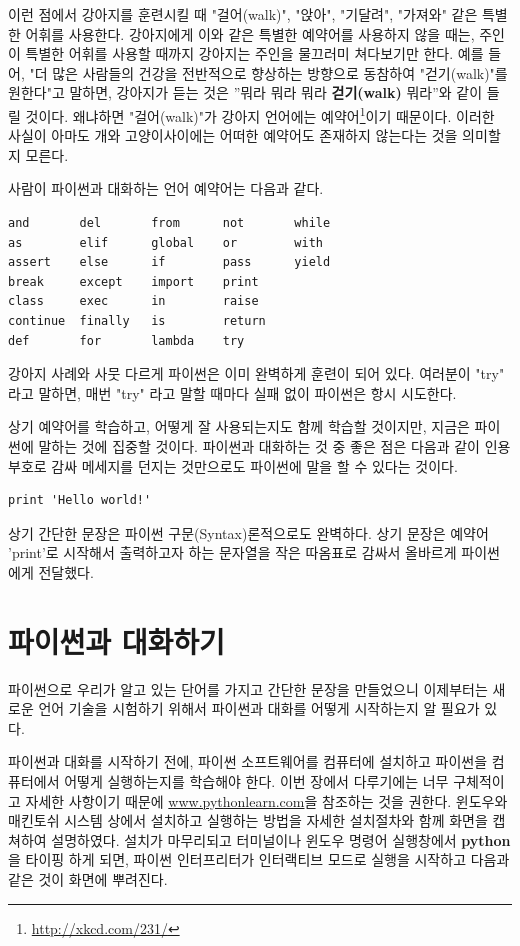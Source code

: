 이런 점에서 강아지를 훈련시킬 때 "걸어(walk)", "앉아", "기달려", "가져와" 같은 특별한 어휘를 사용한다. 
강아지에게 이와 같은 특별한 예약어를 사용하지 않을 때는, 주인이 특별한 어휘를 사용할 때까지 강아지는 주인을 물끄러미 쳐다보기만 한다. 
예를 들어, "더 많은 사람들의 건강을 전반적으로 향상하는 방향으로 동참하여 "걷기(walk)"를 원한다"고 말하면, 
강아지가 듣는 것은 ''뭐라 뭐라 뭐라 {\bf 걷기(walk)} 뭐라''와 같이 들릴 것이다. 
왜냐하면 "걸어(walk)"가 강아지 언어에는 예약어\footnote{\url{http://xkcd.com/231/}}이기 때문이다. 
이러한 사실이 아마도 개와 고양이사이에는 어떠한 예약어도 존재하지 않는다는 것을 의미할지 모른다.

사람이 파이썬과 대화하는 언어 예약어는 다음과 같다.

\beforeverb
\begin{verbatim}
and       del       from      not       while    
as        elif      global    or        with     
assert    else      if        pass      yield    
break     except    import    print              
class     exec      in        raise              
continue  finally   is        return             
def       for       lambda    try
\end{verbatim}
\afterverb
%

강아지 사례와 사뭇 다르게 파이썬은 이미 완벽하게 훈련이 되어 있다. 
여러분이 "try" 라고 말하면, 매번 "try" 라고 말할 때마다 실패 없이 파이썬은 항시 시도한다.

상기 예약어를 학습하고, 어떻게 잘 사용되는지도 함께 학습할 것이지만, 
지금은 파이썬에 말하는 것에 집중할 것이다. 
파이썬과 대화하는 것 중 좋은 점은 다음과 같이 인용부호로 감싸 메세지를 던지는 것만으로도 파이썬에 말을 할 수 있다는 것이다.

\beforeverb
\begin{verbatim}
print 'Hello world!'
\end{verbatim}
\afterverb

상기 간단한 문장은 파이썬 구문(Syntax)론적으로도 완벽하다. 
상기 문장은 예약어 'print'로 시작해서 출력하고자 하는 문자열을 작은 따옴표로 감싸서 올바르게 파이썬에게 전달했다.

\section{파이썬과 대화하기}

파이썬으로 우리가 알고 있는 단어를 가지고 간단한 문장을 만들었으니 이제부터는 
새로운 언어 기술을 시험하기 위해서 파이썬과 대화를 어떻게 시작하는지 알 필요가 있다.

파이썬과 대화를 시작하기 전에, 
파이썬 소프트웨어를 컴퓨터에 설치하고 
파이썬을 컴퓨터에서 어떻게 실행하는지를 학습해야 한다. 
이번 장에서 다루기에는 너무 구체적이고 자세한 사항이기 때문에 
\url{www.pythonlearn.com}을 참조하는 것을 권한다. 
윈도우와 매킨토쉬 시스템 상에서 설치하고 실행하는 방법을 자세한 설치절차와 함께 화면을 캡쳐하여 설명하였다. 
설치가 마무리되고 터미널이나 윈도우 명령어 실행창에서 {\bf python}을 타이핑 하게 되면, 
파이썬 인터프리터가 인터랙티브 모드로 실행을 시작하고 다음과 같은 것이 화면에 뿌려진다.

